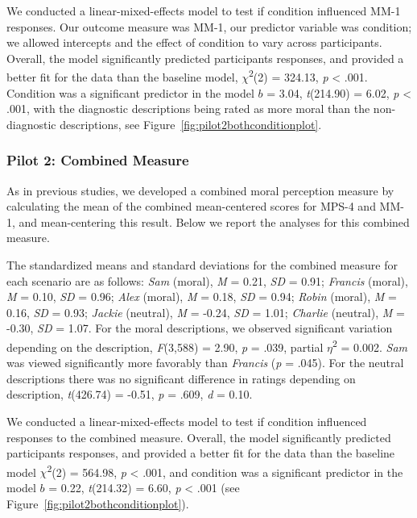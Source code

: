 \documentclass[
  man,floatsintext]{apa6}
\begin{document}
We conducted a linear-mixed-effects model to test if condition influenced MM-1 responses. Our outcome measure was MM-1, our predictor variable was condition; we allowed intercepts and the effect of condition to vary across participants. Overall, the model significantly predicted participants responses, and provided a better fit for the data than the baseline model, \(\chi\)\textsuperscript{2}(2) = 324.13, \emph{p} \textless{} .001. Condition was a significant predictor in the model \(b\) = 3.04, \emph{t}(214.90) = 6.02, \emph{p} \textless{} .001, with the diagnostic descriptions being rated as more moral than the non-diagnostic descriptions, see Figure~\ref{fig:pilot2bothconditionplot}.

\subsubsection{Pilot 2: Combined Measure}\label{pilot-2-combined-measure}

As in previous studies, we developed a combined moral perception measure by calculating the mean of the combined mean-centered scores for MPS-4 and MM-1, and mean-centering this result. Below we report the analyses for this combined measure.

The standardized means and standard deviations for the combined measure for each scenario are as follows:
\emph{Sam} (moral),
\emph{M} = 0.21, \emph{SD} = 0.91;
\emph{Francis} (moral),
\emph{M} = 0.10, \emph{SD} = 0.96;
\emph{Alex} (moral),
\emph{M} = 0.18, \emph{SD} = 0.94;
\emph{Robin} (moral),
\emph{M} = 0.16, \emph{SD} = 0.93;
\emph{Jackie} (neutral),
\emph{M} = -0.24, \emph{SD} = 1.01;
\emph{Charlie} (neutral),
\emph{M} = -0.30, \emph{SD} = 1.07. For the moral descriptions, we observed significant variation depending on the description, \emph{F}(3,588) = 2.90, \emph{p} = .039, partial \(\eta\)\textsuperscript{2} = 0.002. \emph{Sam} was viewed significantly more favorably than \emph{Francis} (\emph{p} = .045). For the neutral descriptions there was no significant difference in ratings depending on description, \emph{t}(426.74) = -0.51, \emph{p} = .609, \emph{d} = 0.10.

We conducted a linear-mixed-effects model to test if condition influenced responses to the combined measure. Overall, the model significantly predicted participants responses, and provided a better fit for the data than the baseline model \(\chi\)\textsuperscript{2}(2) = 564.98, \emph{p} \textless{} .001, and condition was a significant predictor in the model \(b\) = 0.22, \emph{t}(214.32) = 6.60, \emph{p} \textless{} .001 (see Figure~\ref{fig:pilot2bothconditionplot}).
\end{document}
